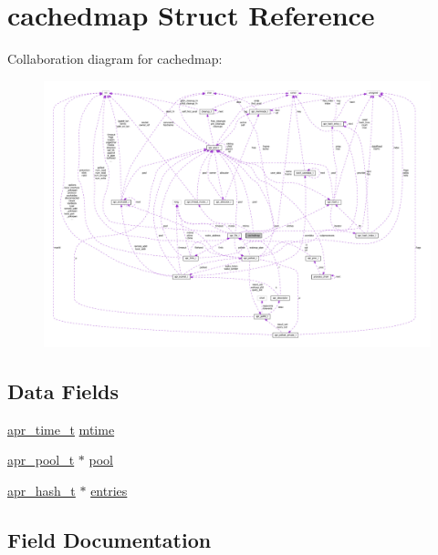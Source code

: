 \hypertarget{structcachedmap}{}\section{cachedmap Struct Reference}
\label{structcachedmap}


Collaboration diagram for cachedmap\+:
\nopagebreak
\begin{figure}[H]
\begin{center}
\leavevmode
\includegraphics[width=350pt]{structcachedmap__coll__graph}
\end{center}
\end{figure}
\subsection*{Data Fields}
\begin{DoxyCompactItemize}
\item 
\hyperlink{group__apr__time_gadb4bde16055748190eae190c55aa02bb}{apr\+\_\+time\+\_\+t} \hyperlink{structcachedmap_a28b63a58b43964bcac9591e83096475d}{mtime}
\item 
\hyperlink{structapr__pool__t}{apr\+\_\+pool\+\_\+t} $\ast$ \hyperlink{structcachedmap_ab1dc4db2ab8307a7e8c61d872c25c540}{pool}
\item 
\hyperlink{structapr__hash__t}{apr\+\_\+hash\+\_\+t} $\ast$ \hyperlink{structcachedmap_a464c75c57c00103d0cff5dac5c5e2fd5}{entries}
\end{DoxyCompactItemize}


\subsection{Field Documentation}

